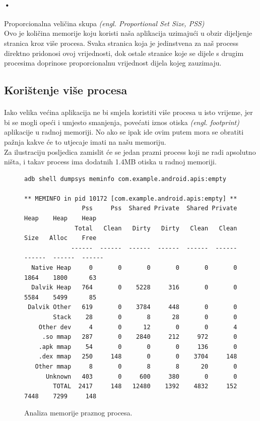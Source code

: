 \documentclass[times, utf8, zavrsni]{fer}
\begin{document}
\paragraph{•}
Proporcionalna veličina skupa \textit{(engl. Proportional Set Size, PSS)}\\
Ovo je količina memorije koju koristi naša aplikacija uzimajući u obzir dijeljenje stranica kroz više procesa. Svaka stranica koja je jedinstvena za naš process direktno pridonosi ovoj vrijednosti, dok ostale stranice koje se dijele s drugim procesima doprinose proporcionalnu vrijednost dijela kojeg zauzimaju.

\subsection{Korištenje više procesa}
\paragraph{}
Iako velika većina aplikacija ne bi smjela koristiti više procesa u isto vrijeme, jer bi se mogli opeći i umjesto smanjenja, povećati iznos otiska \textit{(engl. footprint)} aplikacije u radnoj memoriji. No ako se ipak ide ovim putem mora se obratiti pažnja kakve će to utjecaje imati na našu memoriju.\\

Za ilustraciju posljedica zamislit će se jedan prazni process koji ne radi apsolutno ništa, i takav process ima dodatnih 1.4MB otiska u radnoj memoriji.

\begin{figure}[ht!]
\centering
\begingroup
    \fontsize{8pt}{12pt}\selectfont
		\begin{verbatim}
adb shell dumpsys meminfo com.example.android.apis:empty

** MEMINFO in pid 10172 [com.example.android.apis:empty] **
                Pss     Pss  Shared Private  Shared Private    Heap    Heap    Heap
              Total   Clean   Dirty   Dirty   Clean   Clean    Size   Alloc    Free
             ------  ------  ------  ------  ------  ------  ------  ------  ------
  Native Heap     0       0       0       0       0       0    1864    1800      63
  Dalvik Heap   764       0    5228     316       0       0    5584    5499      85
 Dalvik Other   619       0    3784     448       0       0
        Stack    28       0       8      28       0       0
    Other dev     4       0      12       0       0       4
     .so mmap   287       0    2840     212     972       0
    .apk mmap    54       0       0       0     136       0
    .dex mmap   250     148       0       0    3704     148
   Other mmap     8       0       8       8      20       0
      Unknown   403       0     600     380       0       0
        TOTAL  2417     148   12480    1392    4832     152    7448    7299     148
		\end{verbatim}
\endgroup
\caption{Analiza memorije praznog procesa.}
\label{overflow}
\end{figure}
\end{document}
